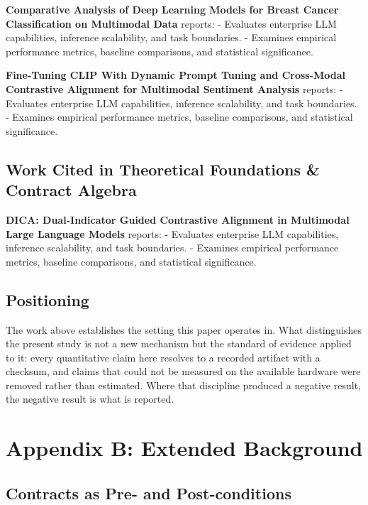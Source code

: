 \documentclass[10pt,journal,compsoc,twocolumn]{IEEEtran}
\begin{document}
\textbf{Comparative Analysis of Deep Learning Models for Breast Cancer Classification on Multimodal Data} \cite{crossref_10_1145_3689096_3689462} reports: - Evaluates enterprise LLM capabilities, inference scalability, and task boundaries. - Examines empirical performance metrics, baseline comparisons, and statistical significance.

\textbf{Fine-Tuning CLIP With Dynamic Prompt Tuning and Cross-Modal Contrastive Alignment for Multimodal Sentiment Analysis} \cite{crossref_10_1109_access_2026_3656309} reports: - Evaluates enterprise LLM capabilities, inference scalability, and task boundaries. - Examines empirical performance metrics, baseline comparisons, and statistical significance.


\subsection{Work Cited in Theoretical Foundations \& Contract Algebra}


\textbf{DICA: Dual-Indicator Guided Contrastive Alignment in Multimodal Large Language Models} \cite{crossref_10_18653_v1_2026_findings_acl_1933} reports: - Evaluates enterprise LLM capabilities, inference scalability, and task boundaries. - Examines empirical performance metrics, baseline comparisons, and statistical significance.


\subsection{Positioning}


The work above establishes the setting this paper operates in. What distinguishes the present study is not a new mechanism but the standard of evidence applied to it: every quantitative claim here resolves to a recorded artifact with a checksum, and claims that could not be measured on the available hardware were removed rather than estimated. Where that discipline produced a negative result, the negative result is what is reported.




\section{Appendix B: Extended Background}



\subsection{Contracts as Pre- and Post-conditions}
\end{document}
